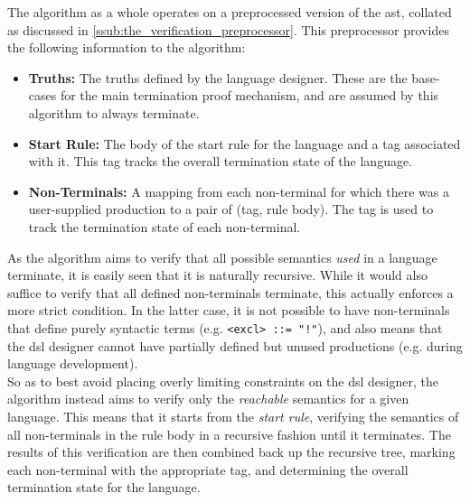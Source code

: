 The algorithm as a whole operates on a preprocessed version of the \gls{ast}, collated as discussed in \autoref{ssub:the_verification_preprocessor}. 
This preprocessor provides the following information to the algorithm:
\begin{itemize}
    \item \textbf{Truths:} The truths defined by the language designer.
    These are the base-cases for the main termination proof mechanism, and are assumed by this algorithm to always terminate.
    \item \textbf{Start Rule:} The body of the start rule for the language and a tag associated with it.
    This tag tracks the overall termination state of the language.
    \item \textbf{Non-Terminals:} A mapping from each non-terminal for which there was a user-supplied production to a pair of (tag, rule body).
    The tag is used to track the termination state of each non-terminal. 
\end{itemize}

As the algorithm aims to verify that all possible semantics \textit{used} in a language terminate, it is easily seen that it is naturally recursive. 
While it would also suffice to verify that all defined non-terminals terminate, this actually enforces a more strict condition. 
In the latter case, it is not possible to have non-terminals that define purely syntactic terms (e.g. \texttt{<excl> ::= "!"}), and also means that the \gls{dsl} designer cannot have partially defined but unused productions (e.g. during language development).\\

So as to best avoid placing overly limiting constraints on the \gls{dsl} designer, the algorithm instead aims to verify only the \textit{reachable} semantics for a given language. 
This means that it starts from the \textit{start rule}, verifying the semantics of all non-terminals in the rule body in a recursive fashion until it terminates. 
The results of this verification are then combined back up the recursive tree, marking each non-terminal with the appropriate tag, and determining the overall termination state for the language. \\

